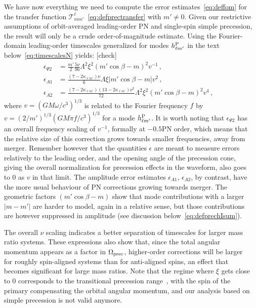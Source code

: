 \documentclass[aps,showpacs,twocolumn,
prd,superscriptaddress,nofootinbib]{revtex4-1}
\newcommand\calT{{\mathcal{T}}}
\newcommand{\SM}[1]{{\color{Red} #1}}
\begin{document}
We have now everything we need to compute the error estimates~\eqref{eq:deffom} for the transfer function $\calT^{\ell}_{mm'}$~\eqref{eq:defprectransfer} with $m' \neq 0$. Given our restrictive  assumptions of orbit-averaged leading-order PN and single-spin simple precession, the result will only be a crude order-of-magnitude estimate. Using the Fourier-domain leading-order timescales generalized for modes $h^{\rm P}_{\ell m'}$ in the text below~\eqref{eq:timescalesN} yields: \SM{[check]}
\begin{subequations}\label{eq:precfomPN}
\begin{align}
	\epsilon_{\Psi 2} &= \frac{m'}{2} \frac{5\nu}{96} \Lambda^{2} \xi^{2} (m' \cos\beta - m)^{2} v^{-1} \,, \\
	\epsilon_{A 1} &=  \frac{(7 - 2\kappa_{\ell m'})\nu}{6} \Lambda \xi |m' \cos\beta - m| v^{2} \,, \\
	\epsilon_{A 2} &= \frac{(7 - 2\kappa_{\ell m'}) (13 - 2\kappa_{\ell m'}) \nu^{2}}{72} \Lambda^{2} \xi^{2} (m' \cos\beta - m)^{2} v^{4} \,,
\end{align}
\end{subequations}
where $v = (G M \omega/c^{3})^{1/3}$ is related to the Fourier frequency $f$ by $v = (2/m')^{1/3} (GM \pi f/c^{3})^{1/3}$ for a mode $h^{\rm P}_{\ell m'}$. It is worth noting that $\epsilon_{\Psi 2}$ has an overall frequency scaling of $v^{-1}$, formally at $-0.5$PN order, which means that the relative size of this correction grows towards smaller frequencies, away from merger. Remember however that the quantities $\epsilon$ are meant to measure errors relatively to the leading order, and the opening angle of the precession cone, giving the overall normalization for precession effects in the waveform, also goes to 0 as $v$ in that limit. The amplitude error estimates $\epsilon_{A1}$, $\epsilon_{A2}$, by contrast, have the more usual behaviour of PN corrections growing towards merger. The geometric factors $(m' \cos\beta - m)$ show that mode contributions with a larger $|m-m'|$ are harder to model, again in a relative sense, but those contributions are however suppressed in amplitude (see discussion below~\eqref{eq:defprechIsum}).

The overall $\nu$ scaling indicates a better separation of timescales for larger mass ratio systems. These expressions also show that, since the total angular momentum appears as a factor in $\Omega_{\rm prec}$, higher-order corrections will be larger for roughly spin-aligned systems than for anti-aligned spins, an effect that becomes significant for large mass ratios. Note that the regime where $\xi$ gets close to 0 corresponds to the transitional precession range~\cite{Apostolatos+94}, with the spin of the primary compensating the orbital angular momentum, and our analysis based on simple precession is not valid anymore.
\end{document}
